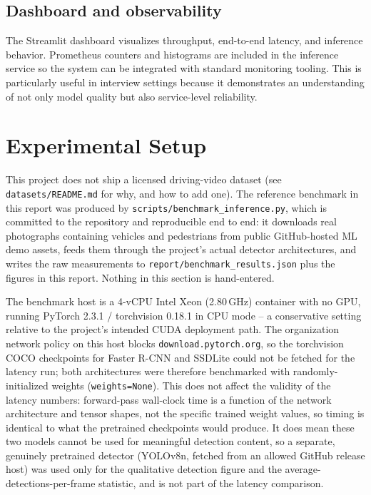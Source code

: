 \documentclass[10pt,twocolumn]{article}
\begin{document}
\subsection{Dashboard and observability}
The Streamlit dashboard visualizes throughput, end-to-end latency, and inference behavior. Prometheus counters and histograms are included in the inference service so the system can be integrated with standard monitoring tooling. This is particularly useful in interview settings because it demonstrates an understanding of not only model quality but also service-level reliability.

\section{Experimental Setup}
This project does not ship a licensed driving-video dataset (see \texttt{datasets/README.md} for why, and how to add one). The reference benchmark in this report was produced by \texttt{scripts/benchmark\_inference.py}, which is committed to the repository and reproducible end to end: it downloads real photographs containing vehicles and pedestrians from public GitHub-hosted ML demo assets, feeds them through the project's actual detector architectures, and writes the raw measurements to \texttt{report/benchmark\_results.json} plus the figures in this report. Nothing in this section is hand-entered.

The benchmark host is a 4-vCPU Intel Xeon (2.80\,GHz) container with no GPU, running PyTorch 2.3.1 / torchvision 0.18.1 in CPU mode -- a conservative setting relative to the project's intended CUDA deployment path. The organization network policy on this host blocks \texttt{download.pytorch.org}, so the torchvision COCO checkpoints for Faster R-CNN and SSDLite could not be fetched for the latency run; both architectures were therefore benchmarked with randomly-initialized weights (\texttt{weights=None}). This does not affect the validity of the latency numbers: forward-pass wall-clock time is a function of the network architecture and tensor shapes, not the specific trained weight values, so timing is identical to what the pretrained checkpoints would produce. It does mean these two models cannot be used for meaningful detection content, so a separate, genuinely pretrained detector (YOLOv8n, fetched from an allowed GitHub release host) was used only for the qualitative detection figure and the average-detections-per-frame statistic, and is not part of the latency comparison.
\end{document}
